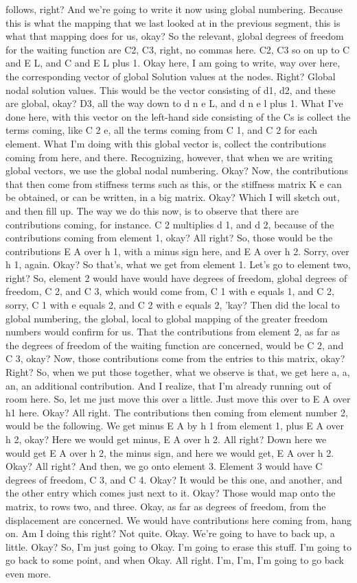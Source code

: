 \documentclass[10pt]{article}
\begin{document}
follows, right? And we're going to write it now using global numbering. Because this is what the mapping that we last looked at in the previous segment, this is what that mapping does for us, okay? So the relevant, global degrees of freedom for the waiting function are C2, C3, right, no commas here. C2, C3 so on up to C and E L, and C and E L plus 1. Okay here, I am going to write, way over here, the corresponding vector of global Solution values at the nodes. Right? Global nodal solution values. This would be the vector consisting of d1, d2, and these are global, okay? D3, all the way down to d n e L, and d n e l plus 1. What I've done here, with this vector on the left-hand side consisting of the Cs is collect the terms coming, like C 2 e, all the terms coming from C 1, and C 2 for each element. What I'm doing with this global vector is, collect the contributions coming from here, and there. Recognizing, however, that when we are writing global vectors, we use the global nodal numbering. Okay? Now, the contributions that then come from stiffness terms such as this, or the stiffness matrix K e can be obtained, or can be written, in a big matrix. Okay? Which I will sketch out, and then fill up. The way we do this now, is to observe that there are contributions coming, for instance. C 2 multiplies d 1, and d 2, because of the contributions coming from element 1, okay? All right? So, those would be the contributions E A over h 1, with a minus sign here, and E A over h 2. Sorry, over h 1, again. Okay? So that's, what we get from element 1. Let's go to element two, right? So, element 2 would have would have degrees of freedom, global degrees of freedom, C 2, and C 3, which would come from, C 1 with e equals 1, and C 2, sorry, C 1 with e equals 2, and C 2 with e equals 2, 'kay? Then did the local to global numbering, the global, local to global mapping of the greater freedom numbers would confirm for us. That the contributions from element 2, as far as the degrees of freedom of the waiting function are concerned, would be C 2, and C 3, okay? Now, those contributions come from the entries to this matrix, okay? Right? So, when we put those together, what we observe is that, we get here a, a, an, an additional contribution. And I realize, that I'm already running out of room here. So, let me just move this over a little. Just move this over to E A over h1 here. Okay? All right. The contributions then coming from element number 2, would be the following. We get minus E A by h 1 from element 1, plus E A over h 2, okay? Here we would get minus, E A over h 2. All right? Down here we would get E A over h 2, the minus sign, and here we would get, E A over h 2. Okay? All right? And then, we go onto element 3. Element 3 would have C degrees of freedom, C 3, and C 4. Okay? It would be this one, and another, and the other entry which comes just next to it. Okay? Those would map onto the matrix, to rows two, and three. Okay, as far as degrees of freedom, from the displacement are concerned. We would have contributions here coming from, hang on. Am I doing this right? Not quite. Okay. We're going to have to back up, a little. Okay? So, I'm just going to Okay. I'm going to erase this stuff. I'm going to go back to some point, and when Okay. All right. I'm, I'm, I'm going to go back even more. 
\end{document}
